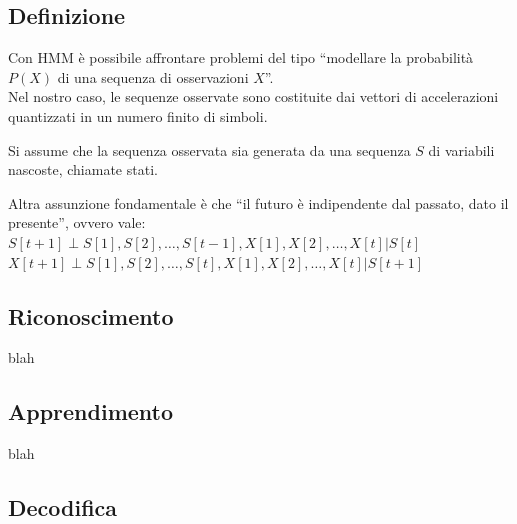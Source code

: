 \documentclass[mathserif]{beamer}
\begin{document}
\subsection{Definizione}

\begin{frame}
 \begin{block}{}
  Con HMM \`e possibile affrontare problemi del tipo ``modellare la probabilit\`a $P(X)$ di una sequenza di osservazioni $X$''.\\
Nel nostro caso, le sequenze osservate sono costituite dai vettori di accelerazioni quantizzati in un numero finito di simboli.
 \end{block}

 \begin{block}{}
  Si assume che la sequenza osservata sia generata da una sequenza $S$ di variabili nascoste, chiamate stati.
 \end{block}

 \begin{block}{}
  Altra assunzione fondamentale \`e che ``il futuro \`e indipendente dal passato, dato il presente'', ovvero vale: \\
$S[t+1] \perp S[1], S[2], \ldots, S[t-1], X[1], X[2], \ldots, X[t] | S[t]$ \\
$X[t+1] \perp S[1], S[2], \ldots, S[t], X[1], X[2], \ldots, X[t] | S[t+1]$
 \end{block}
\end{frame}


\subsection{Riconoscimento}

\begin{frame}
 \begin{block}{}
  blah
 \end{block}

\end{frame}


\subsection{Apprendimento}

\begin{frame}
 \begin{block}{}
  blah
 \end{block}

\end{frame}
\subsection{Decodifica}
\end{document}
